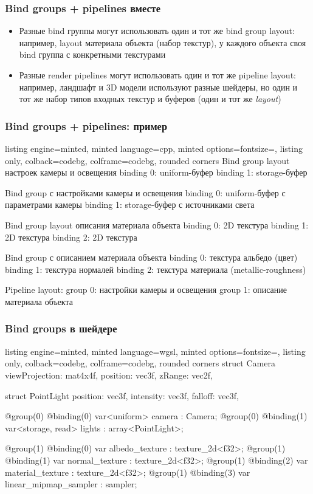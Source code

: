 \documentclass[10pt]{beamer}
\begin{document}
\begin{frame}[fragile]
\frametitle{Bind groups + pipelines вместе}
\begin{itemize}
\item Разные bind группы могут использовать один и тот же bind group layout: например, layout материала объекта (набор текстур), у каждого объекта своя bind группа с конкретными текстурами
\pause
\item Разные render pipelines могут использовать один и тот же pipeline layout: например, ландшафт и 3D модели используют разные шейдеры, но один и тот же набор типов входных текстур и буферов (один и тот же \textit{layout})
\end{itemize}
\end{frame}

\begin{frame}[fragile]
\frametitle{Bind groups + pipelines: пример}
\begin{tcblisting}{listing engine=minted, minted language=cpp, minted options={fontsize=\scriptsize}, listing only, colback=codebg, colframe=codebg, rounded corners}
Bind group layout настроек камеры и освещения
  binding 0: uniform-буфер
  binding 1: storage-буфер

Bind group с настройками камеры и освещения
  binding 0: uniform-буфер с параметрами камеры
  binding 1: storage-буфер с источниками света

Bind group layout описания материала объекта
  binding 0: 2D текстура
  binding 1: 2D текстура
  binding 2: 2D текстура

Bind group с описанием материала объекта
  binding 0: текстура альбедо (цвет)
  binding 1: текстура нормалей
  binding 2: текстура материала (metallic-roughness)

Pipeline layout:
  group 0: настройки камеры и освещения
  group 1: описание материала объекта
\end{tcblisting}
\end{frame}

\begin{frame}[fragile]
\frametitle{Bind groups в шейдере}
\begin{tcblisting}{listing engine=minted, minted language=wgsl, minted options={fontsize=\scriptsize}, listing only, colback=codebg, colframe=codebg, rounded corners}
struct Camera {
  viewProjection: mat4x4f,
  position: vec3f,
  zRange: vec2f,
}

struct PointLight {
  position: vec3f,
  intensity: vec3f,
  falloff: vec3f,
}

@group(0) @binding(0) var<uniform> camera : Camera;
@group(0) @binding(1) var<storage, read> lights : array<PointLight>;

@group(1) @binding(0) var albedo_texture : texture_2d<f32>;
@group(1) @binding(1) var normal_texture : texture_2d<f32>;
@group(1) @binding(2) var material_texture : texture_2d<f32>;
@group(1) @binding(3) var linear_mipmap_sampler : sampler;
\end{tcblisting}
\end{frame}
\end{document}
